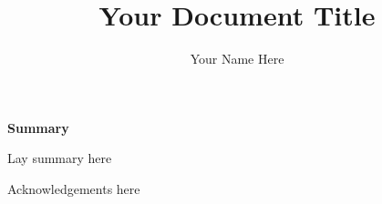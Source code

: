 \documentclass[phd,ilcc,oneside,logo]{infthesis}
\title{Your Document Title}
\author{Your Name Here}
\begin{document}
\begin{preliminary}

\maketitle

\cleardoublepage
\begin{center}
\textsf{\textbf{Summary}}
\end{center}
Lay summary here

\cleardoublepage

\begin{acknowledgements}
Acknowledgements here
\end{acknowledgements}

\standarddeclaration


\tableofcontents


\end{preliminary}





%





\end{document}
